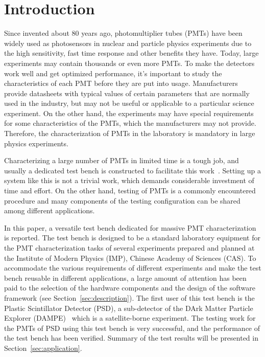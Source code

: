 \documentclass{nst}
\begin{document}

\maketitle


\section{Introduction}
\label{sec:introduction}

Since invented about 80 years ago, photomultiplier tubes (PMTs) have been widely used as photosensors in nuclear and particle physics experiments due to the high sensitivity, fast time response and other benefits they have. 
Today, large experiments may contain thousands or even more PMTs. To make the detectors work well and get optimized performance, it's important to study the characteristics of each PMT before they are put into usage. 
Manufacturers provide datasheets with typical values of certain parameters that are normally used in the industry, but may not be useful or applicable to a particular science experiment.
On the other hand, the experiments may have special requirements for some characteristics of the PMTs, which the manufacturers may not provide. 
Therefore, the characterization of PMTs in the laboratory is mandatory in large physics experiments.

Characterizing a large number of PMTs in limited time is a tough job, and usually a dedicated test bench is constructed to facilitate this work~\cite{barnhill_testing_2008,akgun_complete_2005,adragna_pmt-block_2006}.
Setting up a system like this is not a trivial work, which demands considerable investment of time and effort.
On the other hand, testing of PMTs is a commonly encountered procedure and many components of the testing configuration can be shared among different applications.

In this paper, a versatile test bench dedicated for massive PMT characterization is reported.
The test bench is designed to be a standard laboratory equipment for the PMT characterization tasks of several experiments prepared and planned at the Institute of Modern Physics (IMP), Chinese Academy of Sciences (CAS).
To accommodate the various requirements of different experiments and make the test bench reusable in different applications, a large amount of attention has been paid to the selection of the hardware components and the design of the software framework (see Section~\ref{sec:description}).
The first user of this test bench is the Plastic Scintillator Detector (PSD), a sub-detector of the DArk Matter Particle Explorer (DAMPE)~\cite{Chang_Jin_dampe} which is a satellite-borne experiment. 
The testing work for the PMTs of PSD using this test bench is very successful, and the performance of the test bench has been verified.
Summary of the test results will be presented in Section~\ref{sec:application}.
\end{document}
